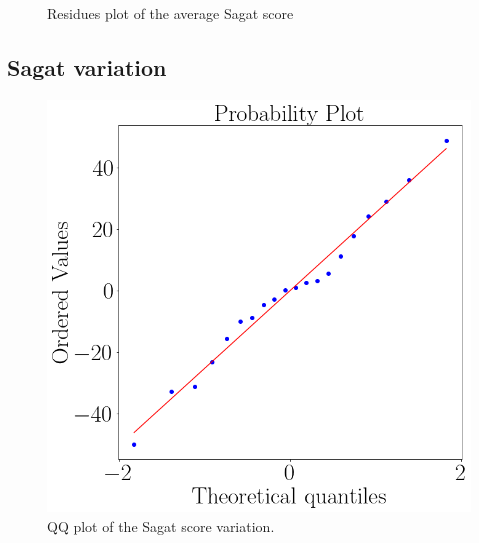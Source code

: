 \begin{figure}[!htb]
\begin{minipage}{0.45\linewidth}
        \caption{Residues plot of the average Sagat score}
        \label{fig:residual_sagat_average}
    \end{minipage}
\end{figure}

\FloatBarrier

\subsection{Sagat variation}

\begin{figure}[!htb]
    \begin{minipage}{0.45\linewidth}
        \centering
        \includegraphics[width = \linewidth]{Resultados/Sagat/Figuras/png/qqplot_sagat_var.png}
        \caption{QQ plot of the Sagat score variation.}
        \label{fig:qqplot_sagat_var}
    \end{minipage}
    \begin{minipage}{0.1\linewidth}
        \hfill
    \end{minipage}
    \begin{minipage}{0.45\linewidth}
        \centering

\end{minipage}
\end{figure}

